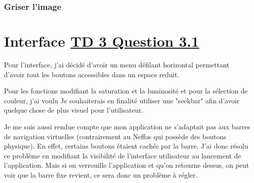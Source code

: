 \documentclass{article}
\begin{document}
\subsubsection{Griser l'image}


\newpage
\section{Interface \underline{TD 3 Question 3.1}}
Pour l'interface, j'ai décidé d'avoir un menu défilant horizontal permettant d'avoir tout les boutons accessibles dans un espace reduit.
\bigbreak 

Pour les fonctions modifiant la saturation et la luminosité et pour la sélection de couleur, j'ai voulu
Je souhaiterais en finalité utiliser une "seekbar" afin d'avoir quelque chose de plus visuel pour l'utilisateur.
\bigbreak

Je me suis aussi rendue compte que mon application ne s’adaptait pas aux barres de navigation virtuelles (contrairement au Neffos qui possède des boutons physique). En effet, certains boutons étaient cachés par la barre. 
J'ai donc résolu ce problème en modifiant la visibilité de l'interface utilisateur au lancement de l'application. Mais si on verrouille l'application et qu'on retourne dessus, on peut voir que la barre fixe revient, ce sera donc un problème à régler.
\end{document}
